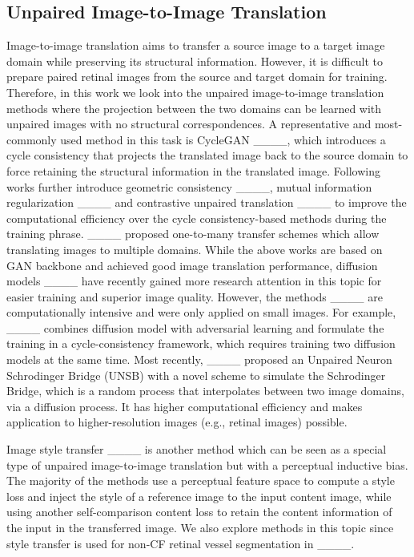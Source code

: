 \subsection{Unpaired Image-to-Image Translation} 
Image-to-image translation aims to transfer a source image to a target image domain while preserving its structural information. However, it is difficult to prepare paired retinal images from the source and target domain for training. Therefore, in this work we look into the unpaired image-to-image translation methods where the projection between the two domains can be learned with unpaired images with no structural correspondences. A representative and most-commonly used method in this task is CycleGAN ____, which introduces a cycle consistency that projects the translated image back to the source domain to force retaining the structural information in the translated image. Following works further introduce geometric consistency ____, mutual information regularization ____ and contrastive unpaired translation ____ to improve the computational efficiency over the cycle consistency-based methods during the training phrase. ____ proposed one-to-many transfer schemes which allow translating images to multiple domains. While the above works are based on GAN backbone and achieved good image translation performance, diffusion models ____ have recently gained more research attention in this topic for easier training and superior image quality. However, the methods ____ are computationally intensive and were only applied on small images. For example, ____ combines diffusion model with adversarial learning and formulate the training in a cycle-consistency framework, which requires training two diffusion models at the same time. Most recently, ____ proposed an Unpaired Neuron Schrodinger Bridge (UNSB) with a novel scheme to simulate the Schrodinger Bridge, which is a random process that interpolates between two image domains, via a diffusion process. It has higher computational efficiency and makes application to higher-resolution images (e.g., retinal images) possible.


Image style transfer ____ is another method which can be seen as a special type of unpaired image-to-image translation but with a perceptual inductive bias. The majority of the methods use a perceptual feature space to compute a style loss and inject the style of a reference image to the input content image, while using another self-comparison content loss to retain the content information of the input in the transferred image. We also explore methods in this topic since style transfer is used for non-CF retinal vessel segmentation in ____. 


